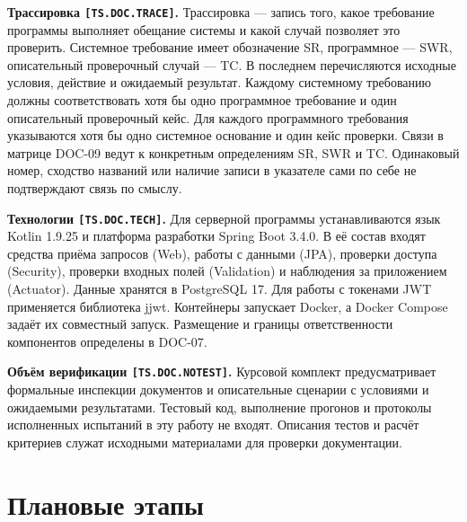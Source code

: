 \documentclass[12pt,a4paper]{article}
\begin{document}
\hypertarget{ts-doc-trace}{} \textbf{Трассировка \texttt{[TS.\allowbreak{}DOC.\allowbreak{}TRACE]}.} Трассировка --- запись того, какое требование программы выполняет обещание системы и какой случай позволяет это проверить. Системное требование имеет обозначение SR, программное --- SWR, описательный проверочный случай --- TC. В последнем перечисляются исходные условия, действие и ожидаемый результат. Каждому системному требованию должны соответствовать хотя бы одно программное требование и один описательный проверочный кейс. Для каждого программного требования указываются хотя бы одно системное основание и один кейс проверки. Связи в матрице DOC-09 ведут к конкретным определениям SR, SWR и TC. Одинаковый номер, сходство названий или наличие записи в указателе сами по себе не подтверждают связь по смыслу.

\hypertarget{ts-doc-tech}{} \textbf{Технологии \texttt{[TS.\allowbreak{}DOC.\allowbreak{}TECH]}.} Для серверной программы устанавливаются язык Kotlin 1.9.25 и платформа разработки Spring Boot 3.4.0. В её состав входят средства приёма запросов (Web), работы с данными (JPA), проверки доступа (Security), проверки входных полей (Validation) и наблюдения за приложением (Actuator). Данные хранятся в PostgreSQL 17. Для работы с токенами JWT применяется библиотека jjwt. Контейнеры запускает Docker, а Docker Compose задаёт их совместный запуск. Размещение и границы ответственности компонентов определены в DOC-07.

\hypertarget{ts-doc-notest}{} \textbf{Объём верификации \texttt{[TS.\allowbreak{}DOC.\allowbreak{}NOTEST]}.} Курсовой комплект предусматривает формальные инспекции документов и описательные сценарии с условиями и ожидаемыми результатами. Тестовый код, выполнение прогонов и протоколы исполненных испытаний в эту работу не входят. Описания тестов и расчёт критериев служат исходными материалами для проверки документации.

\section{Плановые этапы}\label{5-ux43fux43bux430ux43dux43eux432ux44bux435-ux44dux442ux430ux43fux44b}

\hypertarget{5-плановые-этапы}{}
\end{document}
